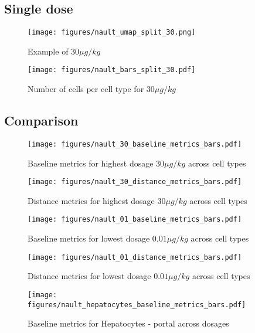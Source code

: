 \subsection{Single dose}


\begin{figure}[h!]
    \centering
    \texttt{[image: figures/nault\_umap\_split\_30.png]}
    \caption{Example of $30 \mu g/kg$}
\end{figure}

\begin{figure}[h!]
    \centering
    \texttt{[image: figures/nault\_bars\_split\_30.pdf]}
    \caption{Number of cells per cell type for $30 \mu g/kg$}
\end{figure}

\clearpage


\subsection{Comparison}


\begin{figure}[h!]
    \centering
    \texttt{[image: figures/nault\_30\_baseline\_metrics\_bars.pdf]}
    \caption{Baseline metrics for highest dosage $30 \mu g/kg$ across cell types}
\end{figure}

\begin{figure}[h!]
    \centering
    \texttt{[image: figures/nault\_30\_distance\_metrics\_bars.pdf]}
    \caption{Distance metrics for highest dosage $30 \mu g/kg$ across cell types}
\end{figure}

\clearpage

\begin{figure}[h!]
    \centering
    \texttt{[image: figures/nault\_01\_baseline\_metrics\_bars.pdf]}
    \caption{Baseline metrics for lowest dosage $0.01 \mu g/kg$ across cell types}
\end{figure}

\begin{figure}[h!]
    \centering
    \texttt{[image: figures/nault\_01\_distance\_metrics\_bars.pdf]}
    \caption{Distance metrics for lowest dosage $0.01 \mu g/kg$ across cell types}
\end{figure}

\clearpage


\begin{figure}[h!]
    \centering
    \texttt{[image: figures/nault\_hepatocytes\_baseline\_metrics\_bars.pdf]}
    \caption{Baseline metrics for Hepatocytes - portal across dosages}
\end{figure}

